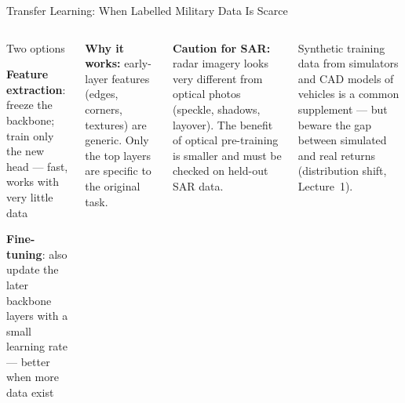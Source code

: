 \documentclass[aspectratio=169,10pt]{beamer}
\begin{document}
\begin{frame}{Transfer Learning: When Labelled Military Data Is Scarce}
\begin{columns}[T]
\begin{cbox}{Two options}
\begin{tl}
\item \textbf{Feature extraction}: freeze the backbone; train only the new head --- fast, works with very little data
\item \textbf{Fine-tuning}: also update the later backbone layers with a small learning rate --- better when more data exist
\end{tl}
\end{cbox}
\begin{rbox}\scriptsize\textbf{Why it works:} early-layer features (edges, corners, textures) are generic. Only the top layers are specific to the original task.\end{rbox}
\begin{wbox}\scriptsize\textbf{Caution for SAR:} radar imagery looks very different from optical photos (speckle, shadows, layover). The benefit of optical pre-training is smaller and must be checked on held-out SAR data.\end{wbox}
\begin{ibox}\scriptsize Synthetic training data from simulators and CAD models of vehicles is a common supplement --- but beware the gap between simulated and real returns (distribution shift, Lecture~1).\end{ibox}
\end{columns}
\end{frame}
\end{document}
